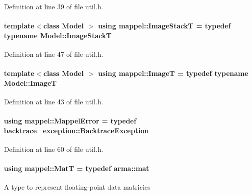 Definition at line 39 of file util.\+h.

\paragraph[{\texorpdfstring{Image\+StackT}{ImageStackT}}]{\setlength{\rightskip}{0pt plus 5cm}template$<$class Model $>$ using {\bf mappel\+::\+Image\+StackT} = typedef typename Model\+::\+Image\+StackT}\hypertarget{namespacemappel_a636dbe5b195c267a5f6a65cd48ff94a6}{}\label{namespacemappel_a636dbe5b195c267a5f6a65cd48ff94a6}


Definition at line 47 of file util.\+h.

\paragraph[{\texorpdfstring{ImageT}{ImageT}}]{\setlength{\rightskip}{0pt plus 5cm}template$<$class Model $>$ using {\bf mappel\+::\+ImageT} = typedef typename Model\+::\+ImageT}\hypertarget{namespacemappel_a14658186b77757f3c35a69cb1be6cf4b}{}\label{namespacemappel_a14658186b77757f3c35a69cb1be6cf4b}


Definition at line 43 of file util.\+h.

\paragraph[{\texorpdfstring{Mappel\+Error}{MappelError}}]{\setlength{\rightskip}{0pt plus 5cm}using {\bf mappel\+::\+Mappel\+Error} = typedef backtrace\+\_\+exception\+::\+Backtrace\+Exception}\hypertarget{namespacemappel_a9a55f6aee1523ba336066874a36dc29c}{}\label{namespacemappel_a9a55f6aee1523ba336066874a36dc29c}


Definition at line 60 of file util.\+h.

\paragraph[{\texorpdfstring{MatT}{MatT}}]{\setlength{\rightskip}{0pt plus 5cm}using {\bf mappel\+::\+MatT} = typedef arma\+::mat}\hypertarget{namespacemappel_a7091ab87c528041f7e2027195fad8915}{}\label{namespacemappel_a7091ab87c528041f7e2027195fad8915}
A type to represent floating-\/point data matricies 

